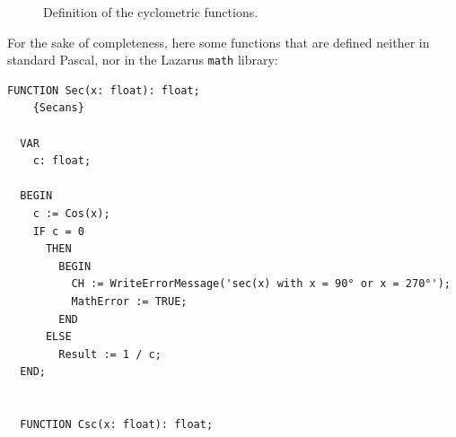 \begin{refsection}
\begin{figure}[t]
 \caption{\capstart Definition of the cyclometric functions.   }
 \label{fig:cyclo}
 \centering
 \hfill
\end{figure}

For the sake of completeness, here some functions that are defined neither in standard Pascal, nor in the Lazarus \texttt{math} library:
\begin{lstlisting}[caption=Cyclometric functions]
  FUNCTION Sec(x: float): float;
    {Secans}

  VAR
    c: float;

  BEGIN
    c := Cos(x);
    IF c = 0
      THEN
        BEGIN
          CH := WriteErrorMessage('sec(x) with x = 90° or x = 270°');
          MathError := TRUE;
        END
      ELSE
        Result := 1 / c;
  END;


  FUNCTION Csc(x: float): float;


\end{lstlisting}
\end{refsection}
